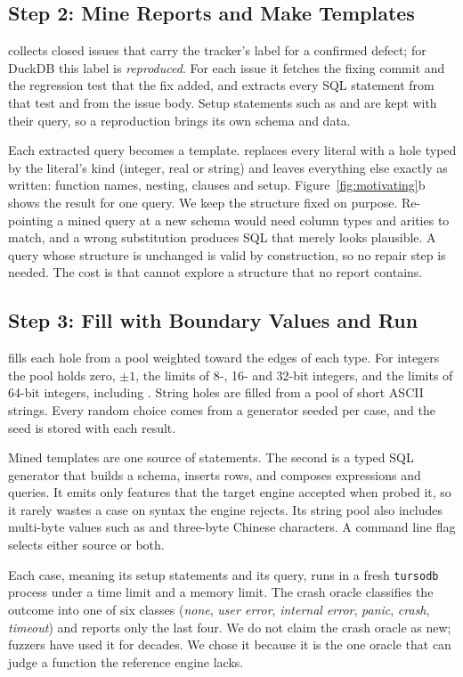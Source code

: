 \subsection{Step 2: Mine Reports and Make Templates}
\label{sec:step-mine}
\tool collects closed issues that carry the tracker's label for a confirmed
defect; for DuckDB this label is \emph{reproduced}. For each issue it fetches the
fixing commit and the regression test that the fix added, and extracts every SQL
statement from that test and from the issue body. Setup statements such as
 and  are kept with their query, so a reproduction
brings its own schema and data.

Each extracted query becomes a template. \tool replaces every literal with a
hole typed by the literal's kind (integer, real or string) and leaves everything
else exactly as written: function names, nesting, clauses and setup.
Figure~\ref{fig:motivating}b shows the result for one query. We keep the
structure fixed on purpose. Re-pointing a mined query at a new schema would need
column types and arities to match, and a wrong substitution produces SQL that
merely looks plausible. A query whose structure is unchanged is valid by
construction, so no repair step is needed. The cost is that \tool cannot explore
a structure that no report contains.

\subsection{Step 3: Fill with Boundary Values and Run}
\label{sec:step-run}
\tool fills each hole from a pool weighted toward the edges of each type. For
integers the pool holds zero, $\pm 1$, the limits of 8-, 16- and 32-bit integers,
and the limits of 64-bit integers, including \imax. String holes are filled from
a pool of short ASCII strings. Every random choice comes from a generator seeded
per case, and the seed is stored with each result.

Mined templates are one source of statements. The second is a typed SQL generator
that builds a schema, inserts rows, and composes expressions and queries. It
emits only features that the target engine accepted when \tool probed it, so it
rarely wastes a case on syntax the engine rejects. Its string pool also includes
multi-byte values such as  and three-byte Chinese characters. A command
line flag selects either source or both.

Each case, meaning its setup statements and its query, runs in a fresh
\texttt{tursodb} process under a time limit and a memory limit. The crash oracle
classifies the outcome into one of six classes (\emph{none}, \emph{user error},
\emph{internal error}, \emph{panic}, \emph{crash}, \emph{timeout}) and reports
only the last four. We do not claim the crash oracle as new; fuzzers have used it
for decades. We chose it because it is the one oracle that can judge a function
the reference engine lacks.

